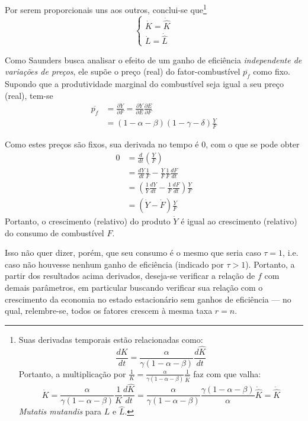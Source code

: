 Por serem proporcionais uns aos outros, conclui-se que\footnote{Suas derivadas temporais estão relacionadas como:
    $$
    \frac{dK}{dt} =\frac{\alpha}{\gamma(1-\alpha-\beta)} \frac{d\hat{K}}{dt}
    $$
    Portanto, a multiplicação por $\frac{1}{K}= \frac{\alpha}{\gamma (1-\alpha-\beta)} \frac{1}{\hat{K}}$ faz com que valha:
    $$
    \dot{K} = \frac{\alpha}{\gamma(1-\alpha-\beta)} \frac{1}{K} \frac{d \hat{K}}{dt} = \frac{\alpha}{\gamma(1-\alpha-\beta)} \frac{\gamma(1-\alpha-\beta)}{\alpha} \dot{\hat{K}} = \dot{\hat{K}}
    $$
    \textit{Mutatis mutandis} para $L$ e $\hat{L}$.}
$$
\begin{cases}
\dot{K} = \dot{\hat{K}} \\
\dot{L} = \dot{\hat{L}}
\end{cases}
$$

Como Saunders busca analisar o efeito de um ganho de eficiência \textit{independente de variações de preços}, ele supõe o preço (real) do fator-combustível $\overline{p_{f}}$ como fixo. Supondo que a produtividade marginal do combustível seja igual a seu preço (real), tem-se
\begin{align*}
\overline{p_{f}} &= \frac{ \partial Y }{ \partial F } = \frac{ \partial Y }{ \partial E }  \frac{ \partial E }{ \partial F }  \\
&= (1-\alpha-\beta) (1-\gamma-\delta) \frac{Y}{F}
\end{align*}

Como estes preços são fixos, sua derivada no tempo é $0$, com o que se pode obter
\begin{align}
    \label{equacao_cresc_combustivel}
0 &= \frac{d}{dt} \left( \frac{Y}{F} \right) \\
&= \frac{dY}{dt} \frac{1}{F} - \frac{Y}{F} \frac{1}{F} \frac{dF}{dt} \\
&= \left( \frac{1}{Y} \frac{dY}{dt} - \frac{1}{F} \frac{dF}{dt} \right) \frac{Y}{F} \\
&= \left(\dot{Y} - \dot{F}\right) \frac{Y}{F}
\end{align}
Portanto, o crescimento (relativo) do produto $\dot{Y}$ é igual ao crescimento (relativo) do consumo de combustível $F$. 

Isso não quer dizer, porém, que seu consumo é o mesmo que seria caso $\tau=1$, i.e. caso não houvesse nenhum ganho de eficiência (indicado por $\tau>1$). Portanto, a partir dos resultados acima derivados, deseja-se verificar a relação de $f$ com demais parâmetros, em particular buscando verificar sua relação com o crescimento da economia no estado estacionário sem ganhos de eficiência --- no qual, relembre-se, todos os fatores crescem à mesma taxa $r=n$. 

